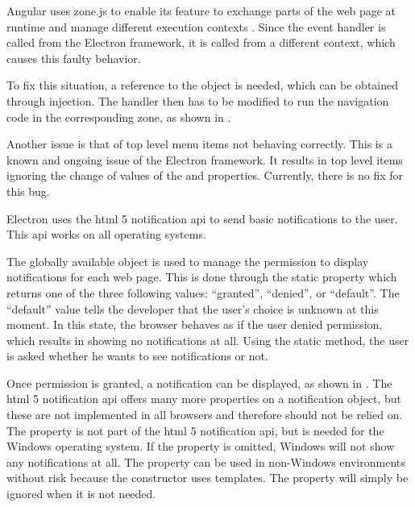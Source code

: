 Angular uses zone.js to enable its  feature to exchange parts of the web page at runtime and manage different execution contexts \cite{zoneJS}. Since the  event handler is called from the Electron framework, it is called from a different context, which causes this faulty behavior.

To fix this situation, a reference to the  object is needed, which can be obtained through injection. The  handler then has to be modified to run the navigation code in the corresponding zone, as shown in .


Another issue is that of top level menu items not behaving correctly. This is a known and ongoing issue of the Electron framework. It results in top level items ignoring the change of values of the  and  properties. Currently, there is no fix for this bug. \cite{topMenuItems}


Electron uses the \gls{html} 5 notification \gls{api} to send basic notifications to the user. This \gls{api} works on all operating systems.

The globally available  object is used to manage the permission to display notifications for each web page. This is done through the static  property which returns one of the three following values: \enquote{granted}, \enquote{denied}, or \enquote{default}. The \enquote{default} value tells the developer that the user's choice is unknown at this moment. In this state, the browser behaves as if the user denied permission, which results in showing no notifications at all. Using the static  method, the user is asked whether he wants to see notifications or not.

Once permission is granted, a notification can be displayed, as shown in . The \gls{html} 5 notification \gls{api} offers many more properties on a notification object, but these are not implemented in all browsers and therefore should not be relied on. The  property is not part of the \gls{html} 5 notification \gls{api}, but is needed for the Windows operating system. If the property is omitted, Windows will not show any notifications at all. The property can be used in non-Windows environments without risk because the constructor uses templates. The property will simply be ignored when it is not needed. \cite{mdnNotification}

